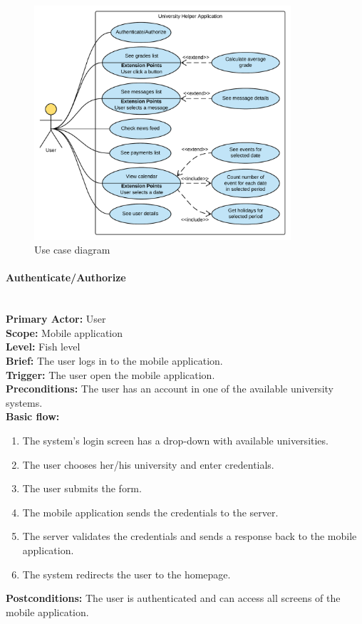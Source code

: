 \begin{figure}[htb]
    \centering
    \includegraphics[width=0.85\textwidth]{fig02/use_case_diagram.png}
    \caption{Use case diagram} \label{fig:use-case-diagram}
\end{figure}


\paragraph{\large{Authenticate/Authorize}}\mbox{}\\[2pt]
\textbf{Primary Actor:} User\\
\textbf{Scope:} Mobile application\\
\textbf{Level:} Fish level\\
\textbf{Brief:} The user logs in to the mobile application.\\
\textbf{Trigger:} The user open the mobile application.\\
\textbf{Preconditions:}
The user has an account in one of the available university systems.\\
\textbf{Basic flow:}
\begin{enumerate}
    \item The system's login screen has a drop-down with available universities.
    \item The user chooses her/his university and enter credentials.
    \item The user submits the form.
    \item The mobile application sends the credentials to the server.
    \item The server validates the credentials and sends a response back to the mobile application.
    \item The system redirects the user to the homepage.
\end{enumerate}
\textbf{Postconditions:}
The user is authenticated and can access all screens of the mobile application.

